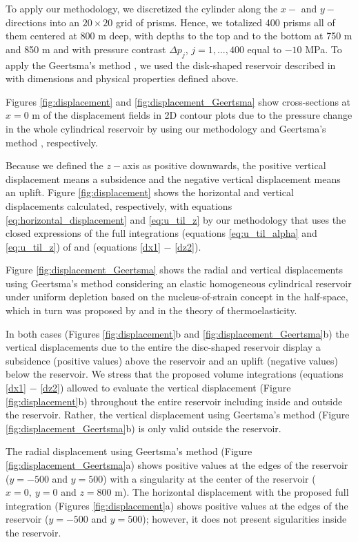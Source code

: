 \documentclass[journal abbreviation, manuscript]{copernicus}
\begin{document}
To apply our methodology, we  discretized the cylinder  along the $x-$ and $y-$ directions into an $20 \times 20$ grid of prisms. Hence, we totalized 400 prisms all of them centered at 800 m deep, with depths to the top and to the bottom at 750 m and 850 m  and with pressure contrast $\Delta p_j$, $j = 1, ..., 400$ equal to $-10$ MPa.
To apply the Geertsma’s method \citep{Geertsma73}, we used the disk-shaped reservoir described in \cite{Fjaer08} with dimensions and physical properties defined above.
 
Figures \ref{fig:displacement}  and \ref{fig:displacement_Geertsma}  show cross-sections at 
$x  = 0$ m of the displacement fields in 2D contour plots  due to the pressure change in the whole  cylindrical reservoir by using our methodology and Geertsma’s method \citep{Geertsma73}, respectively.

Because we defined the $z-$axis as positive downwards, the positive vertical displacement means a subsidence and the negative vertical displacement means an uplift.
Figure \ref{fig:displacement}  shows the horizontal and vertical displacements  calculated, respectively, with equations \ref{eq:horizontal_displacement} and \ref{eq:u_til_z} by our methodology that uses the closed expressions of the full integrations (equations \ref{eq:u_til_alpha} and \ref{eq:u_til_z}) of \cite{Nagyetal2000} and \cite{Nagyetal2002} (equations \ref{dx1} $-$ \ref{dz2}).

Figure \ref{fig:displacement_Geertsma} shows the radial and vertical displacements using Geertsma’s method \citep{Geertsma73}  considering an elastic homogeneous cylindrical reservoir under uniform depletion based on the nucleus-of-strain concept in the half-space, which in turn was proposed by \cite{Mindlin&Cheng50} and \cite{Sen51} in the theory of thermoelasticity.

In both cases (Figures \ref{fig:displacement}b and \ref{fig:displacement_Geertsma}b) the vertical displacements due to the entire the disc-shaped reservoir display a subsidence (positive values) above the reservoir and an uplift (negative values) below the reservoir.
We stress that the proposed volume integrations  (equations \ref{dx1} $-$ \ref{dz2})  allowed  to evaluate the  vertical displacement (Figure \ref{fig:displacement}b) throughout  the entire reservoir including inside and outside the reservoir.
Rather, the  vertical displacement using Geertsma’s method 
(Figure \ref{fig:displacement_Geertsma}b) is only valid outside the reservoir. 

The radial displacement using Geertsma’s method 
(Figure \ref{fig:displacement_Geertsma}a) shows positive values at the edges of the reservoir ($y= -500$ and $y = 500$) with a singularity at the center of the reservoir 
($x= 0, \: y = 0$ and $z = 800$ m). 
The horizontal displacement with the proposed full integration 
(Figures \ref{fig:displacement}a) shows positive values at the edges of the reservoir ($y= -500$ and $y = 500$); however, it does not present sigularities inside the reservoir.
 
\end{document}
